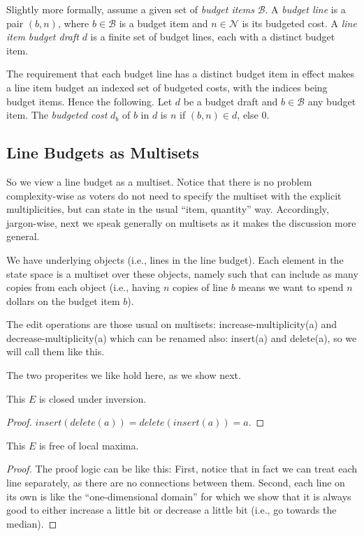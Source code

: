 \documentclass[sigconf]{aamas}  %
\newcommand{\calB}{\mathcal{B}}
\begin{document}
Slightly more formally,
assume a given set of \emph{budget items} $\calB$. A \emph{budget line} is a pair $(b,n)$, where $b \in \calB$ is a budget item and $n \in \mathcal{N}$ is its budgeted cost.  A \emph{line item budget draft} $d$ is a finite set of budget lines, each with a distinct budget item.

The requirement that each budget line has a distinct budget item in effect makes a line item budget an indexed set of budgeted costs, with the indices being
budget items.  Hence the following.
Let $d$ be a budget draft and $b \in \calB$  any budget item. The \emph{budgeted cost} $d_b$ of $b$ in $d$ is $n$ if $(b,n) \in d$, else 0.


\subsection{Line Budgets as Multisets}

So we view a line budget as a multiset. Notice that there is no problem complexity-wise as voters do not need to specify the multiset with the explicit multiplicities, but can state in the usual ``item, quantity'' way.
Accordingly, jargon-wise, next we speak generally on multisets as it makes the discussion more general.

We have underlying objects (i.e., lines in the line budget). Each element in the state space is a multiset over these objects, namely such that can include as many copies from each object (i.e., having $n$ copies of line $b$ means we want to spend $n$ dollars on the budget item $b$). 

The edit operations are those usual on multisets:  
  increase-multiplicity(a) and decrease-multiplicity(a) which can be renamed also: insert(a) and delete(a),
  so we will call them like this.

The two properites we like hold here, as we show next.

\begin{lemma}
  This $E$ is closed under inversion.
\end{lemma}

\begin{proof}
$insert(delete(a)) = delete(insert(a)) = a$.
\end{proof}

\begin{lemma}
  This $E$ is free of local maxima.
\end{lemma}

\begin{proof}
%
The proof logic can be like this:
  First, notice that in fact we can treat each line separately, as there are no connections between them.
  Second, each line on its own is like the ``one-dimensional domain'' for which we show that it is always good to either increase a little bit or decrease a little bit (i.e., go towards the median).
%
\end{proof}
  
\end{document}
